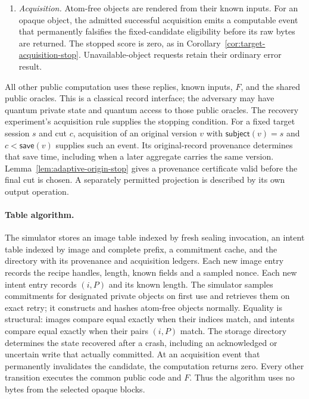 \documentclass[pdflatex]{sn-jnl}
\theoremstyle{thmstyleone}
\theoremstyle{thmstylethree}
\theoremstyle{thmstyletwo}
\begin{document}
\begin{enumerate}
  retained image or intent handles. Copy, retain, persist, delete, crash
  and resume update an explicit durable-state directory. Storage choices,
  errors and branch decisions depend on available metadata, lengths,
  commitments and $F$ outputs. A failure after commit preserves that commit.
  \item \emph{Acquisition.} Atom-free objects are rendered from their known
  inputs. For an opaque object, the admitted successful acquisition emits
  a computable event that permanently falsifies the fixed-candidate
  eligibility before its raw bytes are returned. The stopped score is zero,
  as in Corollary~\ref{cor:target-acquisition-stop}. Unavailable-object requests
  retain their ordinary error result.
\end{enumerate}

All other public computation uses these replies, known inputs, $F$, and the
shared public oracles. This is a classical record interface; the adversary
may have quantum private state and quantum access to those public oracles.
The recovery experiment's acquisition rule supplies the stopping condition.
For a fixed target session $s$ and cut $c$, acquisition
of an original version $v$ with $\mathsf{subject}(v)=s$ and
$c<\mathsf{save}(v)$ supplies such an event. Its original-record provenance
determines that save time, including when a later aggregate carries the same
version. Lemma~\ref{lem:adaptive-origin-stop} gives a provenance certificate
valid before the final cut is chosen. A separately permitted projection is
described by its own output operation.

\paragraph{Table algorithm.}
The simulator stores an image table indexed by fresh sealing invocation,
an intent table indexed by image and complete prefix, a commitment cache,
and the directory with its provenance and acquisition ledgers. Each new
image entry records the recipe handles, length, known fields and a sampled
nonce. Each new intent entry records $(i,P)$ and its known length. The
simulator samples commitments for designated private objects on first use
and retrieves them on exact retry; it constructs and hashes atom-free
objects normally.
Equality is structural: images compare equal exactly when their indices
match, and intents compare equal exactly when their pairs $(i,P)$ match.
The storage directory determines the state recovered after a crash, including
an acknowledged or uncertain write that actually committed. At an acquisition
event that permanently invalidates the candidate, the computation returns
zero. Every other transition executes the common public code and $F$.
Thus the algorithm uses
no bytes from the selected opaque blocks.
\end{document}
